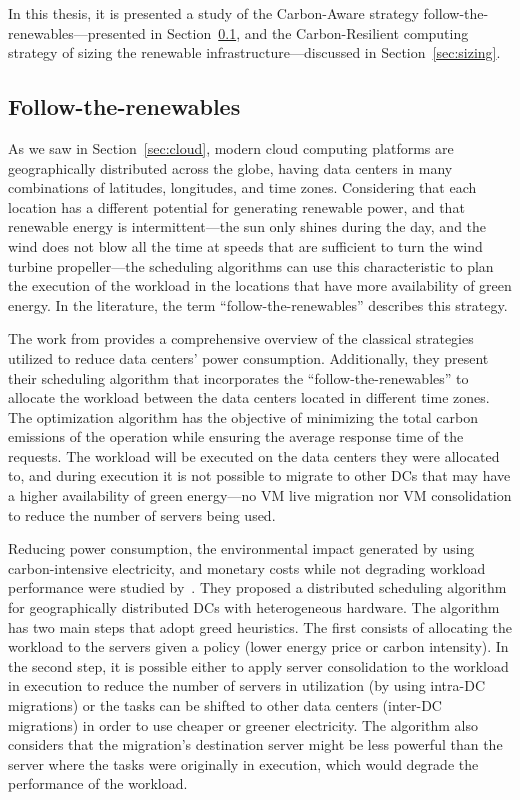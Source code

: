 In this thesis, it is presented a study of the Carbon-Aware strategy follow-the-renewables---presented in Section~\ref{sec:followtherenewables}, and the Carbon-Resilient computing strategy of sizing the renewable infrastructure---discussed in Section~\ref{sec:sizing}.

\subsection{Follow-the-renewables}

\label{sec:followtherenewables}

As we saw in Section~\ref{sec:cloud}, modern cloud computing platforms are geographically distributed across the globe, having data centers in many combinations of latitudes, longitudes, and time zones. Considering that each location has a different potential for generating renewable power, and that renewable energy is intermittent---the sun only shines during the day, and the wind does not blow all the time at speeds that are sufficient to turn the wind turbine propeller---the scheduling algorithms can use this characteristic to plan the execution of the workload in the locations that have more availability of green energy. In the literature, the term ``follow-the-renewables'' \cite{shuja2016sustainable} describes this strategy. 


The work from \citet{XU2020191} provides a comprehensive overview of the classical strategies utilized to reduce data centers' power consumption. Additionally, they present their scheduling algorithm that incorporates the ``follow-the-renewables'' to allocate the workload between the data centers located in different time zones. The optimization algorithm has the objective of minimizing the total carbon emissions of the operation while ensuring the average response time of the requests. The workload will be executed on the data centers they were allocated to, and during execution it is not possible to migrate to other DCs that may have a higher availability of green energy---no VM live migration nor VM consolidation to reduce the number of servers being used.



Reducing power consumption, the environmental impact generated by using carbon-intensive electricity, and monetary costs while not degrading workload performance were studied by~\citet{ALI2021110907}. They proposed a distributed scheduling algorithm for geographically distributed DCs with heterogeneous hardware. The algorithm has two main steps that adopt greed heuristics. The first consists of allocating the workload to the servers given a policy (lower energy price or carbon intensity). In the second step, it is possible either to apply server consolidation to the workload in execution to reduce the number of servers in utilization (by using intra-DC migrations) or the tasks can be shifted to other data centers (inter-DC migrations) in order to use cheaper or greener electricity. The algorithm also considers that the migration's destination server might be less powerful than the server where the tasks were originally in execution, which would degrade the performance of the workload.

